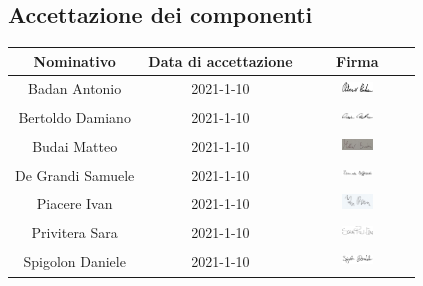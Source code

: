 \subsection{Accettazione dei componenti}
\begin{table}[H]
	\centering
	\renewcommand{\arraystretch}{1.5}
	\begin{tabular}{|c|c|c|}
		\hline
		\rowcolor{lighter-grayer}
		Nominativo & Data di accettazione & Firma \\
		\hline
		Badan Antonio & 2021-1-10 & \includegraphics[width=0.3\textwidth, height=5mm]{res/images/firma1}\\
		\hline
		Bertoldo Damiano & 2021-1-10 & \includegraphics[width=0.3\textwidth, height=5mm]{res/images/firma2} \\
		\hline
		Budai Matteo & 2021-1-10 & \includegraphics[width=0.3\textwidth, height=5mm]{res/images/firma3} \\
		\hline
		De Grandi Samuele & 2021-1-10 & \includegraphics[width=0.3\textwidth, height=5mm]{res/images/firma4} \\
		\hline
		Piacere Ivan & 2021-1-10 & \includegraphics[width=0.3\textwidth, height=5mm]{res/images/firma5}\\
		\hline
		Privitera Sara & 2021-1-10 & \includegraphics[width=0.3\textwidth, height=5mm]{res/images/firma6}\\
		\hline
		Spigolon Daniele & 2021-1-10 & \includegraphics[width=0.3\textwidth, height=5mm]{res/images/firma7}\\
		\hline
	\end{tabular}
\end{table}


